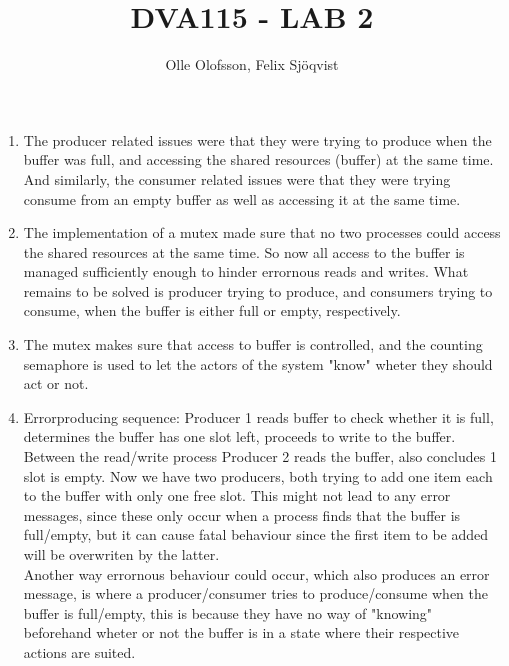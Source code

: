 \documentclass[12pt]{article}
\title{DVA115 - LAB 2}
\author{Olle Olofsson, Felix Sjöqvist}
\begin{document}
\maketitle

\begin{enumerate}
    \item The producer related issues were that they were trying to produce when the buffer was full, and accessing the shared resources (buffer) at the same time. And similarly, the consumer related issues were that they were trying consume from an empty buffer as well as accessing it at the same time.
    \item The implementation of a mutex made sure that no two processes could access the shared resources at the same time. So now all access to the buffer is managed sufficiently enough to hinder errornous reads and writes. What remains to be solved is producer trying to produce, and consumers trying to consume, when the buffer is either full or empty, respectively.
    \item The mutex makes sure that access to buffer is controlled, and the counting semaphore is used to let the actors of the system "know" wheter they should act or not.
    \item Errorproducing sequence: Producer 1 reads buffer to check whether it is full, determines the buffer has one slot left, proceeds to write to the buffer. Between the read/write process Producer 2 reads the buffer, also concludes 1 slot is empty. Now we have two producers, both trying to add one item each to the buffer with only one free slot. This might not lead to any error messages, since these only occur when a process finds that the buffer is full/empty, but it can cause fatal behaviour since the first item to be added will be overwriten by the latter.\\Another way errornous behaviour could occur, which also produces an error message, is where a producer/consumer tries to produce/consume when the buffer is full/empty, this is because they have no way of "knowing" beforehand wheter or not the buffer is in a state where their respective actions are suited.
\end{enumerate}
\end{document}
